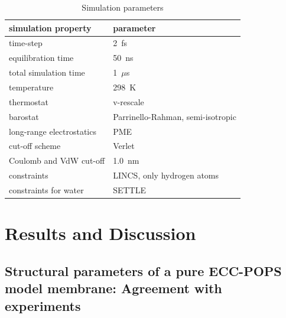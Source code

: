 \documentclass[journal=jpcbfk,manuscript=article]{achemso}
\begin{document}
\begin{table}[tbp]
  \caption{Simulation parameters}
  \label{tbl:mdpar}
  \begin{tabular}{ll}
    simulation property & parameter   \\
    \hline
    time-step           & 2~fs         \\
    equilibration time  & 50~ns  \\
    total simulation time     & 1~$\mu$s  \\
    temperature         & 298~K       \\
    thermostat          & v-rescale  \cite{bussi07}   \\
    barostat            & Parrinello-Rahman, semi-isotropic \cite{parrinello81} \\
    long-range electrostatics & PME  \cite{darden93}  \\
    cut-off scheme      & Verlet \cite{Pall13}      \\
    Coulomb and VdW cut-off & 1.0~nm \\
    constraints         & LINCS, only hydrogen atoms \cite{hess97} \\
    constraints for water & SETTLE  \cite{miyamoto92} \\
    \hline
  \end{tabular}
\end{table}
 

 






\section{Results and Discussion} 
 
\subsection{Structural parameters of a pure ECC-POPS model membrane: Agreement with experiments} 
 
\end{document}
